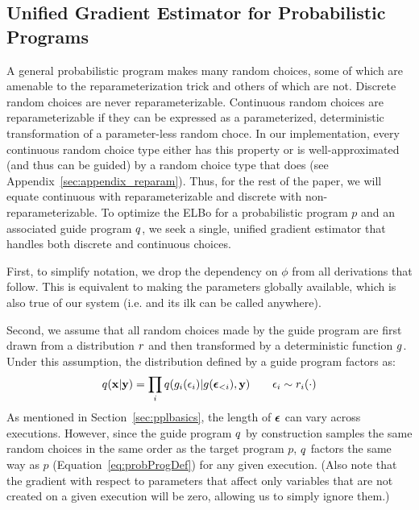 \subsection{Unified Gradient Estimator for Probabilistic Programs}
\label{sec:optimization:unifiedEstimator}

A general probabilistic program makes many random choices, some of which are amenable to the reparameterization trick and others of which are not.
Discrete random choices are never reparameterizable. Continuous random choices are reparameterizable if they can be expressed as a parameterized, deterministic transformation of a parameter-less random choce. In our implementation, every continuous random choice type either has this property or is well-approximated (and thus can be guided) by a random choice type that does (see Appendix~\ref{sec:appendix_reparam}). Thus, for the rest of the paper, we will equate  continuous with reparameterizable and discrete with non-reparameterizable.
To optimize the ELBo for a probabilistic program $p$ and an associated guide program $q$, we seek a single, unified gradient estimator that handles both discrete and continuous choices.

First, to simplify notation, we drop the dependency on $\phi$ from all derivations that follow. This is equivalent to making the parameters globally available, which is also true of our system (i.e.  and its ilk can be called anywhere).

Second, we assume that all random choices made by the guide program are first drawn from a distribution $r$ and then transformed by a deterministic function $g$. Under this assumption, the distribution defined by a guide program factors as:
\begin{equation*}
q(\mathbf{x} | \mathbf{y}) = \prod_i q(g_i(\epsilon_i) | g(\bm{\epsilon}_{<i}), \mathbf{y}) \hspace{2em} \epsilon_i \sim r_i(\cdot)
\end{equation*}
As mentioned in Section~\ref{sec:pplbasics}, the length of $\bm{\epsilon}$ can vary across executions. However, since the guide program $q$ by construction samples the same random choices in the same order as the target program $p$, $q$ factors the same way as $p$ (Equation~\ref{eq:probProgDef}) for any given execution. 
(Also note that the gradient with respect to parameters that affect only variables that are not created on a given execution will be zero, allowing us to simply ignore them.)

